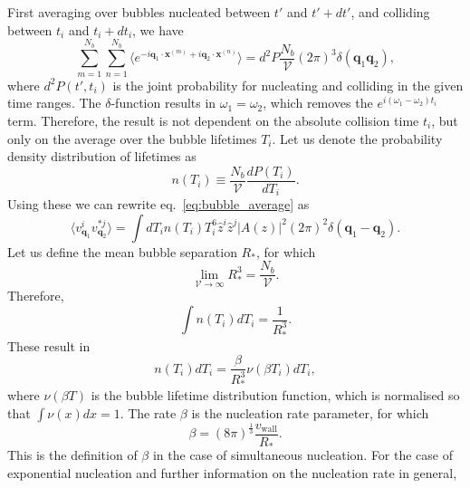 First averaging over bubbles nucleated between $t'$ and $t' + dt'$, and colliding between $t_i$ and $t_i + dt_i$, we have
\cite[eq. 4.13]{hindmarsh_gw_pt_2019}
\begin{equation}
\sum_{m=1}^{N_b} \sum_{n=1}^{N_b} \langle e^{-i \mathbf{q}_1 \cdot \mathbf{x}^{(m)} + i \mathbf{q}_2 \cdot \mathbf{x}^{(n)}} \rangle
= d^2 P \frac{N_b}{\mathcal{V}} (2\pi)^3 \delta(\mathbf{q}_1 \mathbf{q}_2),
\label{eq:bubble_average}
\end{equation}
where $d^2 P(t', t_i)$ is the joint probability for nucleating and colliding in the given time ranges.
The $\delta$-function results in $\omega_1 = \omega_2$, which removes the $e^{i(\omega_1 - \omega_2)t_i}$ term.
Therefore, the result is not dependent on the absolute collision time $t_i$,
but only on the average over the bubble lifetimes $T_i$.
Let us denote the probability density distribution of lifetimes as
\begin{equation}
n(T_i) \equiv \frac{N_b}{\mathcal{V}} \frac{dP(T_i)}{dT_i}.
\end{equation}
Using these we can rewrite eq.~\eqref{eq:bubble_average} as
\begin{equation}
\langle v_{\mathbf{q}_1}^i v_{\mathbf{q}_2}^{*j} \rangle = \int dT_i n(T_i) T_i^6 \hat{z}^i \hat{z}^j |A(z)|^2 (2\pi)^2 \delta(\mathbf{q}_1 - \mathbf{q}_2).
\end{equation}
Let us define the mean bubble separation $R_*$, for which
\begin{equation}
\lim_{\mathcal{V}\rightarrow\infty} R_*^3 = \frac{N_b}{\mathcal{V}}.
\end{equation}
Therefore,
\begin{equation}
\int n(T_i) dT_i = \frac{1}{R_*^3}.
\end{equation}
These result in
\cite[eq. 4.15]{hindmarsh_gw_pt_2019}
\begin{equation}
n(T_i) dT_i = \frac{\beta}{R_*^3} \nu(\beta T_i) dT_i,
\end{equation}
where $\nu (\beta T)$ is the bubble lifetime distribution function, which is normalised so that $\int \nu(x) dx = 1$.
The rate $\beta$ is the nucleation rate parameter, for which
\cite[eq. 4.16]{hindmarsh_gw_pt_2019}
\begin{equation}
\beta = (8 \pi)^{\frac{1}{3}} \frac{v_\text{wall}}{R_*}.
\end{equation}
This is the definition of $\beta$ in the case of simultaneous nucleation.
For the case of exponential nucleation and further information on the nucleation rate in general,
